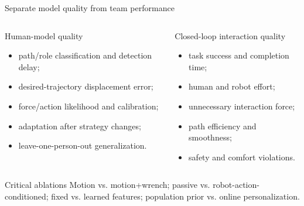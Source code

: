 \documentclass[aspectratio=169,11pt]{beamer}
\begin{document}
\begin{frame}{Separate model quality from team performance}
\begin{columns}[T,onlytextwidth]
\begin{block}{Human-model quality}
\begin{itemize}
  \item path/role classification and detection delay;
  \item desired-trajectory displacement error;
  \item force/action likelihood and calibration;
  \item adaptation after strategy changes;
  \item leave-one-person-out generalization.
\end{itemize}
\end{block}
\begin{block}{Closed-loop interaction quality}
\begin{itemize}
  \item task success and completion time;
  \item human and robot effort;
  \item unnecessary interaction force;
  \item path efficiency and smoothness;
  \item safety and comfort violations.
\end{itemize}
\end{block}
\end{columns}
\vspace{0.22cm}
\begin{exampleblock}{Critical ablations}
Motion vs. motion+wrench; passive vs. robot-action-conditioned; fixed vs. learned features; population prior vs. online personalization.
\end{exampleblock}
\end{frame}
\end{document}
